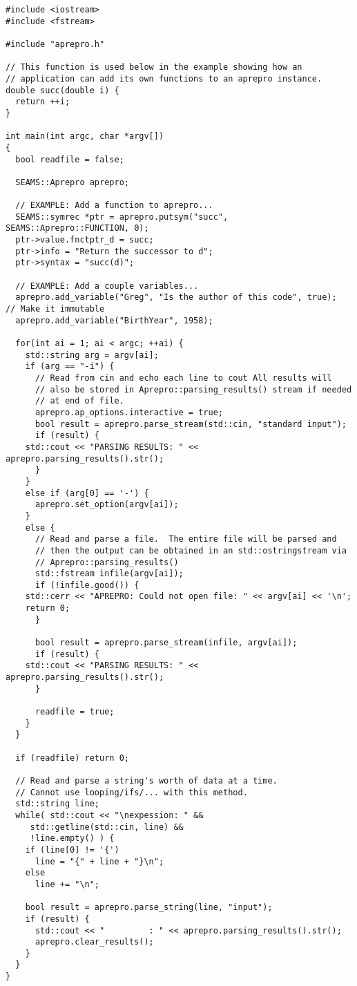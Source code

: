 \begin{lstlisting}
#include <iostream>
#include <fstream>

#include "aprepro.h"

// This function is used below in the example showing how an
// application can add its own functions to an aprepro instance.
double succ(double i) {
  return ++i;
}

int main(int argc, char *argv[])
{
  bool readfile = false;

  SEAMS::Aprepro aprepro;
  
  // EXAMPLE: Add a function to aprepro...
  SEAMS::symrec *ptr = aprepro.putsym("succ", SEAMS::Aprepro::FUNCTION, 0);
  ptr->value.fnctptr_d = succ;
  ptr->info = "Return the successor to d";
  ptr->syntax = "succ(d)";
  
  // EXAMPLE: Add a couple variables...
  aprepro.add_variable("Greg", "Is the author of this code", true);  // Make it immutable
  aprepro.add_variable("BirthYear", 1958);
  
  for(int ai = 1; ai < argc; ++ai) {
    std::string arg = argv[ai];
    if (arg == "-i") {
      // Read from cin and echo each line to cout All results will
      // also be stored in Aprepro::parsing_results() stream if needed
      // at end of file.
      aprepro.ap_options.interactive = true;
      bool result = aprepro.parse_stream(std::cin, "standard input");
      if (result) {
	std::cout << "PARSING RESULTS: " << aprepro.parsing_results().str();
      }
    }
    else if (arg[0] == '-') {
      aprepro.set_option(argv[ai]);
    } 
    else {
      // Read and parse a file.  The entire file will be parsed and
      // then the output can be obtained in an std::ostringstream via
      // Aprepro::parsing_results()
      std::fstream infile(argv[ai]);
      if (!infile.good()) {
	std::cerr << "APREPRO: Could not open file: " << argv[ai] << '\n';
	return 0;
      }

      bool result = aprepro.parse_stream(infile, argv[ai]);
      if (result) {
	std::cout << "PARSING RESULTS: " << aprepro.parsing_results().str();
      }

      readfile = true;
    }
  }

  if (readfile) return 0;
    
  // Read and parse a string's worth of data at a time.
  // Cannot use looping/ifs/... with this method.
  std::string line;
  while( std::cout << "\nexpession: " &&
	 std::getline(std::cin, line) &&
	 !line.empty() ) {
    if (line[0] != '{') 
      line = "{" + line + "}\n";
    else
      line += "\n";
    
    bool result = aprepro.parse_string(line, "input");
    if (result) {
      std::cout << "         : " << aprepro.parsing_results().str();
      aprepro.clear_results();
    }
  }
}
\end{lstlisting}
